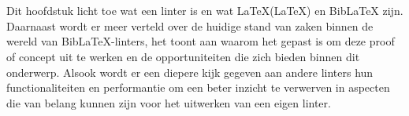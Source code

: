 \chapter{}%
\label{ch:stand-van-zaken}






Dit hoofdstuk licht toe wat een linter is en wat LaTeX(\LaTeX) en BibLaTeX zijn. Daarnaast wordt er meer verteld over de huidige stand van zaken binnen de wereld van BibLaTeX-linters, het toont aan waarom het gepast is om deze proof of concept uit te werken en de opportuniteiten die zich bieden binnen dit onderwerp. Alsook wordt er een diepere kijk gegeven aan andere linters hun functionaliteiten en performantie om een beter inzicht te verwerven in aspecten die van belang kunnen zijn voor het uitwerken van een eigen linter.


